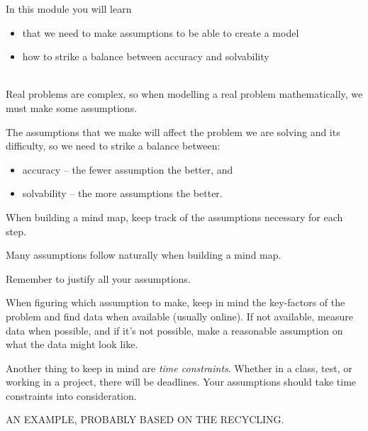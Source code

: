 In this module you will learn
\begin{itemize}
	\item that we need to make assumptions to be able to create a model
	\item how to strike a balance between accuracy and solvability
\end{itemize}

\hfill \\




Real problems are complex, so when modelling a real problem mathematically, we must make some assumptions. 

The assumptions that we make will affect the problem we are solving and its difficulty, so we need to strike a balance between:
\begin{itemize}
\item accuracy -- the fewer assumption the better, and
\item solvability -- the more assumptions the better.
\end{itemize}

\begin{annotation}
	\begin{goals}
		When building a mind map, keep track of the assumptions necessary for each step.
	\end{goals}
\end{annotation}

Many assumptions follow naturally when building a mind map. \\


\begin{annotation}
	\begin{goals}
		Remember to justify all your assumptions.
	\end{goals}
\end{annotation}

When figuring which assumption to make, keep in mind the key-factors of the problem and find data when available (usually online). 
If not available, measure data when possible, and if it's not possible, make a reasonable assumption on what the data might look like.

Another thing to keep in mind are \emph{time constraints}. Whether in a class, test, or working in a project, there will be deadlines. Your assumptions should take time constraints into consideration. 



\begin{example}

AN EXAMPLE, PROBABLY BASED ON THE RECYCLING.
	
\end{example}





